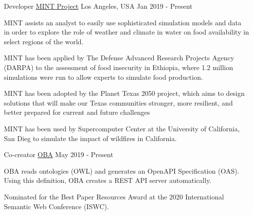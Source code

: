 \begin{cventries}
  \cventry
    {Developer}
    {\href{https://mintproject.readthedocs.io/en/stable/}{MINT Project}}
    {Los Angeles, USA}
    {Jan 2019 - Present}
    {
      \begin{cvitems}
        \item {MINT assists an analyst to easily use sophisticated simulation models and data in order to explore the role of weather and climate in water on food availability in select regions of the world.}
        \item {MINT has been applied by The Defense Advanced Research Projects Agency (DARPA) to the assessment of food insecurity in Ethiopia, where 1.2 million simulations were run to allow experts to simulate food production.}
        \item {MINT has been adopted by the Planet Texas 2050 project, which aims to design solutions that will make our Texas communities stronger, more resilient, and better prepared for current and future challenges}
        \item {MINT has been used by Supercomputer Center at the University of California, San Dieg to simulate the impact of wildfires in California.}
      \end{cvitems}
    }

  \cventry
      {Co-creator}
      {\href{https://github.com/KnowledgeCaptureAndDiscovery/OBA}{OBA}}
      {}
      {May 2019 - Present}
      {
        \begin{cvitems}
          \item {OBA reads ontologies (OWL) and generates an OpenAPI Specification (OAS). Using this definition, OBA creates a REST API server automatically.}
          \item {Nominated for the Best Paper Resources Award at the 2020 International Semantic Web Conference (ISWC).}
        \end{cvitems}
      }

\end{cventries}
